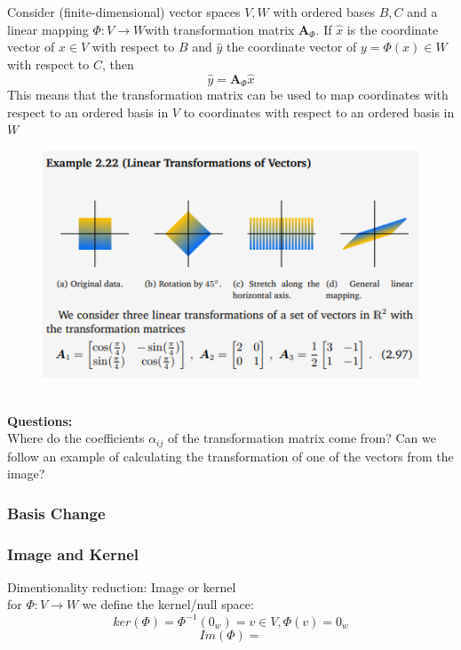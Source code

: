 Consider (finite-dimensional) vector spaces $V,W$ with ordered bases $B,C$ and a linear mapping $\Phi: V \longrightarrow W $with transformation matrix $\mathbf{A}_{\Phi}$. If $\hat{x}$ is the coordinate vector of $x \in V$ with respect to $B$ and $\hat{y}$ the coordinate vector of $y = \Phi(x) \in W$ with respect to $C$, then
\[
    \hat{y} = \mathbf{A}_{\Phi}\hat{x}    
\]
This means that the transformation matrix can be used to map coordinates with respect to an ordered basis in $V$ to coordinates with respect to an ordered basis in $W$
\begin{figure}[htbp]
    \centering
    \includegraphics[width=12cm]{Mathematical Background/example-transformation-matrix-application.png}
\end{figure}\\
\textbf{Questions:}\\
Where do the coefficients $\alpha_{ij}$ of the transformation matrix come from? Can we follow an example of calculating the transformation of one of the vectors from the image?
\subsubsection*{Basis Change}
\subsubsection*{Image and Kernel}
Dimentionality reduction:
Image or kernel\\
for $\Phi : V \rightarrow W$ we define the kernel/null space:
$$ker(\Phi) = \Phi^{-1}(0_w) = {v \in V, \Phi(v) = 0_w}$$
$$Im(\Phi) = $$